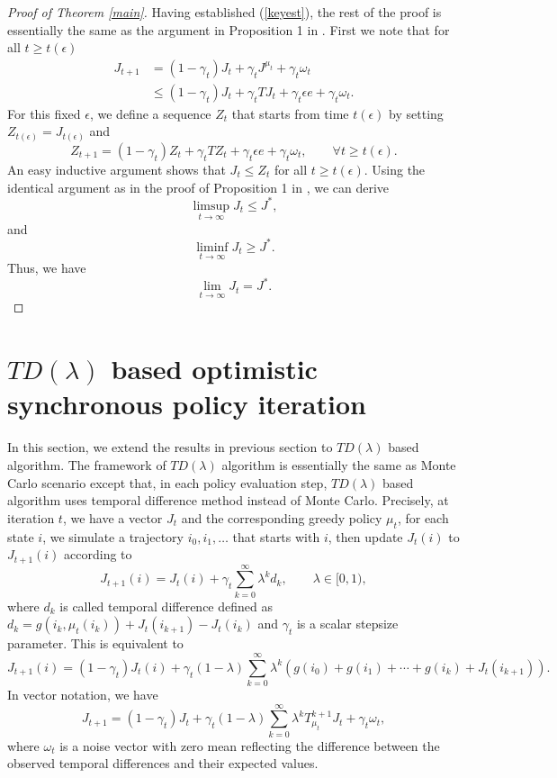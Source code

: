 \documentclass[12pt,a4paper]{amsart}
\numberwithin{equation}{section}
\theoremstyle{plain}
\theoremstyle{definition}
\begin{document}
\begin{proof} [Proof of Theorem \ref{main}]
	Having established (\ref{keyest}),  the rest of the proof is essentially the same as the argument in Proposition 1 in \cite{Ts03}. 
	 First we note that for all $t \ge t(\epsilon)$
	$$
	\begin{aligned}
	J_{t+1} & = (1-\gamma_t) J_t + \gamma_t J^{\mu_t} + \gamma_t \omega_t \\
	& \le (1-\gamma_t) J_t + \gamma_t TJ_t + \gamma_t \epsilon e + \gamma_t \omega_t.
	\end{aligned}
	$$
	For this fixed $\epsilon$,  we define a sequence $Z_t$ that starts from time $t(\epsilon)$ by setting $Z_{t(\epsilon)} = J_{t(\epsilon)}$ and 
	$$
	Z_{t+1} = (1-\gamma_t) Z_t + \gamma_t TZ_t + \gamma_t \epsilon e + \gamma_t \omega_t, \qquad \forall t \ge t(\epsilon).
	$$
	An easy inductive argument shows that $J_t \leq Z_t$ for all $t \ge t(\epsilon)$. Using the identical argument as in the proof of Proposition 1 in \cite{Ts03},  we can derive
	$$
	\limsup_{t  \to \infty} J_t \le J^{*}, 
	$$
	and
	$$
	\liminf_{t \to \infty} J_t \geq J^{*}. 
	$$ 
	Thus, we have 
	$$
	\lim_{t \to \infty} J_t = J^{*}. 
	$$
\end{proof}

\section{$TD(\lambda)$ based optimistic synchronous policy iteration}
In this section, we extend the results in previous section to $TD(\lambda)$ based algorithm. The framework of $TD(\lambda)$ algorithm is essentially the same as Monte Carlo scenario except that, in each policy evaluation step, $TD(\lambda)$ based algorithm uses temporal difference method instead of Monte Carlo. Precisely, at iteration $t$, we have a vector $J_t$ and the corresponding greedy policy $\mu_t$, for each state $i$, we simulate a trajectory $i_0, i_1, \dots$ that starts with $i$, then update $J_t(i)$ to $J_{t+1}(i)$ according to
$$
J_{t+1} (i) = J_t(i)  + \gamma_t \sum_{k=0}^{\infty} \lambda^k d_k, \qquad \lambda \in [0, 1), 
$$
where $d_k$ is called temporal difference defined as $d_k = g(i_k, \mu_t(i_k)) + J_t(i_{k+1}) - J_t(i_k) $ and $\gamma_t$ is a scalar stepsize parameter. This is equivalent to 
$$
J_{t+1}(i) = (1-\gamma_t) J_t(i) + \gamma_t (1-\lambda) \sum_{k=0}^{\infty} \lambda^k \left(g(i_0) + g(i_1) + \cdots + g(i_k) + J_t(i_{k+1}) \right).
$$
In vector notation, we have
\begin{equation} \label{updaterule2}
J_{t+ 1} = (1-\gamma_t)J_t + \gamma_t(1-\lambda) \sum_{k=0}^{\infty} \lambda^k T_{\mu_t}^{k+1} J_t  + \gamma_t \omega_t,
\end{equation}
where $\omega_t$ is a noise vector with zero mean reflecting the difference between the observed temporal differences and their expected values.
\end{document}
